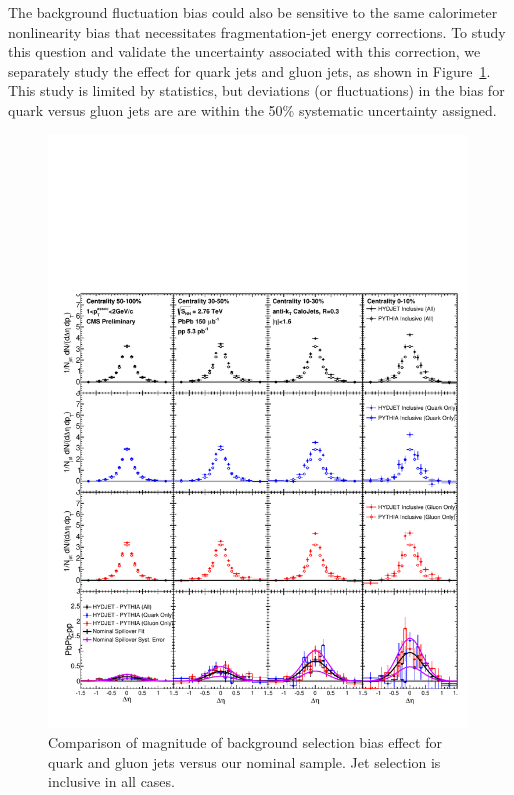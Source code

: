 The background fluctuation bias could also be sensitive to the same calorimeter nonlinearity bias that necessitates fragmentation-jet energy corrections.  To study this question and validate the uncertainty associated with this correction, we separately study the effect for quark jets and gluon jets, as shown in Figure~\ref{fig:quark_gluon_closure}.  This study is limited by statistics, but deviations (or fluctuations) in the bias for quark versus gluon jets are are within the 50\% systematic uncertainty assigned.  


                  \begin{figure}[hbtp]
                  \begin{center}\includegraphics[width=0.99\textwidth]{figures/JFF_SpillOver/QuarkGluonComparison.pdf}
                  \caption[Comparison of background selection bias effect for quark verus gluon jets]{Comparison of magnitude of background selection bias effect for quark and gluon jets versus our nominal sample.  Jet selection is inclusive in all cases.}
                    \label{fig:quark_gluon_closure}
                    \end{center}
                    \end{figure}


